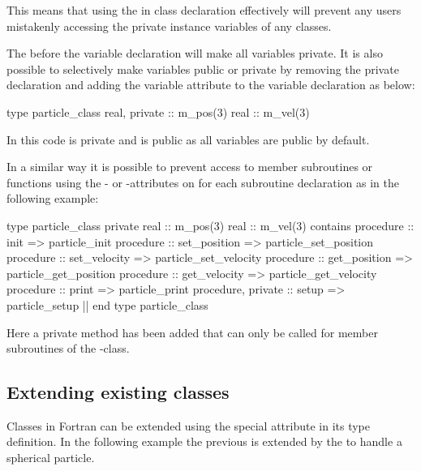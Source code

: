 This means that using the  in class declaration effectively will prevent any users mistakenly accessing the private instance variables of any classes.

The  before the variable declaration will make all variables private. It is also possible to selectively make variables public or private by removing the private declaration and adding the variable attribute  to the variable declaration as below:

\begin{fortrancodeenv}
type particle_class
    real, private :: m_pos(3)
    real :: m_vel(3)
\end{fortrancodeenv}

In this code  is private and  is public as all variables are public by default.

In a similar way it is possible to prevent access to member subroutines or functions using the - or -attributes on for each subroutine declaration as in the following example:

\begin{fortrancodeenv}
type particle_class
private
    real :: m_pos(3)
    real :: m_vel(3)
contains
    procedure :: init => particle_init
    procedure :: set_position => particle_set_position
    procedure :: set_velocity => particle_set_velocity
    procedure :: get_position => particle_get_position
    procedure :: get_velocity => particle_get_velocity
    procedure :: print => particle_print
    procedure, private :: setup => particle_setup |\hladded|
end type particle_class
\end{fortrancodeenv}

Here a private method  has been added that can only be called for member subroutines of the -class.

\subsection{Extending existing classes}

Classes in Fortran can be extended using the special attribute  in its type definition. In the following example the previous  is extended by the  to handle a spherical particle.

